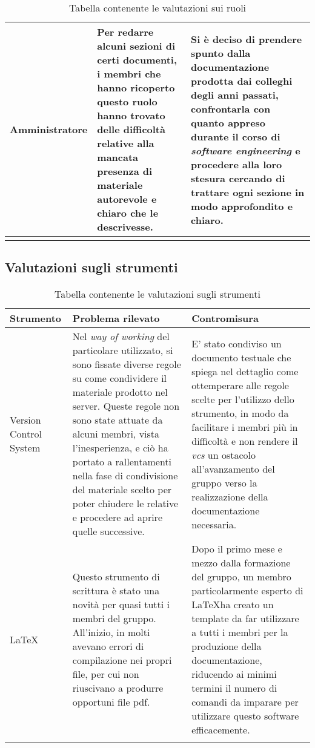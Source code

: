 \begin{center}
\begin{longtable}{|p{3cm}|p{6cm}|p{6cm}|}
	\hline
	Amministratore
	 &
	Per redarre alcuni sezioni di certi documenti, i membri che hanno ricoperto questo ruolo hanno trovato delle difficoltà relative alla mancata presenza di materiale autorevole e chiaro che le descrivesse.
	 	& 
Si è deciso di prendere spunto dalla documentazione prodotta dai colleghi degli anni passati, confrontarla con quanto appreso durante il corso di \textit{software engineering} e procedere alla loro stesura cercando di trattare ogni sezione in modo approfondito e chiaro. \\
	\hline	
	\caption{Tabella contenente le valutazioni sui ruoli}
		\end{longtable}
	\end{center}

	\newpage	
	
	\subsection{Valutazioni sugli strumenti}

		\begin{center}
	\begin{longtable}{|p{3cm}|p{6cm}|p{6cm}|}
	\hline
	\rowcolor{lighter-grayer}
	\textbf{Strumento} & \textbf{Problema rilevato} & \textbf{Contromisura}\\
	\hline
	\endfirsthead


	\hline
	Version Control System
	 &
	Nel \textit{way of working} del particolare \glock{vcs} utilizzato, si sono fissate diverse regole su come condividere il materiale prodotto nel server. Queste regole non sono state attuate da alcuni membri, vista l'inesperienza, e ciò ha portato a rallentamenti nella fase di condivisione del materiale scelto per poter chiudere le \glock{milestone} relative e procedere ad aprire quelle successive.  
	 	& 
E' stato condiviso un documento testuale che spiega nel dettaglio come ottemperare alle regole scelte per l'utilizzo dello strumento, in modo da facilitare i membri più in difficoltà e non rendere il \textit{vcs} un ostacolo all'avanzamento del gruppo verso la realizzazione della documentazione necessaria.  \\
	\hline
	
		\hline
	\LaTeX
	 &
	Questo strumento di scrittura è stato una novità per quasi tutti i membri del gruppo. All'inizio, in molti avevano errori di compilazione nei propri file, per cui non riuscivano a produrre opportuni file pdf. 
	 	& 
Dopo il primo mese e mezzo dalla formazione del gruppo, un membro particolarmente esperto di  \LaTeX ha creato un template da far utilizzare a tutti i membri per la produzione della documentazione, riducendo ai minimi termini il numero di comandi da imparare per utilizzare questo software efficacemente.\\
	\hline
	\caption{Tabella contenente le valutazioni sugli strumenti}
		\end{longtable}
	\end{center}